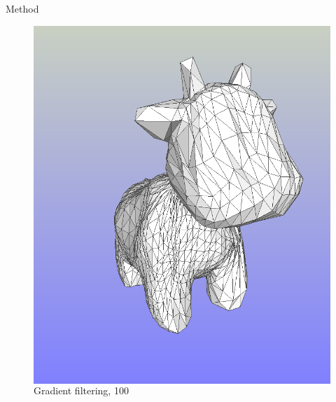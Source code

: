 \documentclass[beamer]{standalone}
\begin{document}
\begin{frame}{Method}
\begin{figure}
\begin{columns}[t]
                    \includegraphics[width=\linewidth]{./figures/spot-new.png}
                    \caption{Gradient filtering, 100}
            \end{columns}
        \end{figure}

\end{frame}
\end{document}

